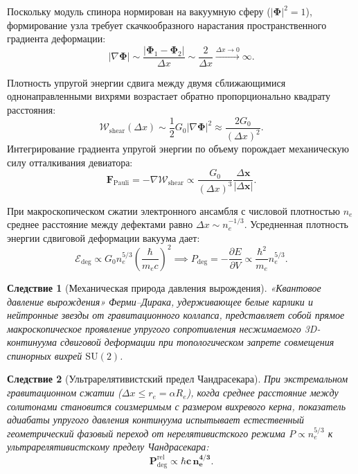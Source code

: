 \documentclass[12pt,a4paper]{article}
\newtheorem{corollary}{Следствие}
\begin{document}
	Поскольку модуль спинора нормирован на вакуумную сферу ($|\boldsymbol{\Phi}|^2 = 1$), формирование узла требует скачкообразного нарастания пространственного градиента деформации:
	\begin{equation}
		|\nabla \boldsymbol{\Phi}| \sim \frac{|\boldsymbol{\Phi}_1 - \boldsymbol{\Phi}_2|}{\Delta x} \sim \frac{2}{\Delta x} \xrightarrow{\Delta x \to 0} \infty.
	\end{equation}
	
	Плотность упругой энергии сдвига между двумя сближающимися однонаправленными вихрями возрастает обратно пропорционально квадрату расстояния:
	\begin{equation}
		\mathcal{W}_{\text{shear}}(\Delta x) \sim \frac{1}{2} G_0 |\nabla \boldsymbol{\Phi}|^2 \approx \frac{2 G_0}{(\Delta x)^2}.
	\end{equation}
	Интегрирование градиента упругой энергии по объему порождает механическую силу отталкивания девиатора:
	\begin{equation}
		\mathbf{F}_{\text{Pauli}} = -\nabla \mathcal{W}_{\text{shear}} \propto \frac{G_0}{(\Delta x)^3} \frac{\Delta \mathbf{x}}{|\Delta \mathbf{x}|}.
	\end{equation}
	
	При макроскопическом сжатии электронного ансамбля с числовой плотностью $n_e$ среднее расстояние между дефектами равно $\Delta x \sim n_e^{-1/3}$. Усредненная плотность энергии сдвиговой деформации вакуума дает:
	\begin{equation}
		\mathcal{E}_{\text{deg}} \propto G_0 n_e^{5/3} \left( \frac{\hbar}{m_e c} \right)^2 \implies P_{\text{deg}} = -\frac{\partial E}{\partial V} \propto \frac{\hbar^2}{m_e} n_e^{5/3}.
	\end{equation}
	
	\begin{corollary}[Механическая природа давления вырождения]
		«Квантовое давление вырождения» Ферми--Дирака, удерживающее белые карлики и нейтронные звезды от гравитационного коллапса, представляет собой прямое макроскопическое проявление упругого сопротивления несжимаемого 3D-континуума сдвиговой деформации при топологическом запрете совмещения спинорных вихрей $\mathrm{SU}(2)$.
	\end{corollary}
	
	\begin{corollary}[Ультрарелятивистский предел Чандрасекара]
		При экстремальном гравитационном сжатии ($\Delta x \le r_e = \alpha R_e$), когда среднее расстояние между солитонами становится соизмеримым с размером вихревого керна, показатель адиабаты упругого давления континуума испытывает естественный геометрический фазовый переход от нерелятивистского режима $P \propto n_e^{5/3}$ к ультрарелятивистскому пределу Чандрасекара:
		\begin{equation}
			\mathbf{P_{\mathrm{deg}}^{\mathrm{rel}} \propto \hbar c \, n_e^{4/3}}.
		\end{equation}
	\end{corollary}
	
\end{document}
